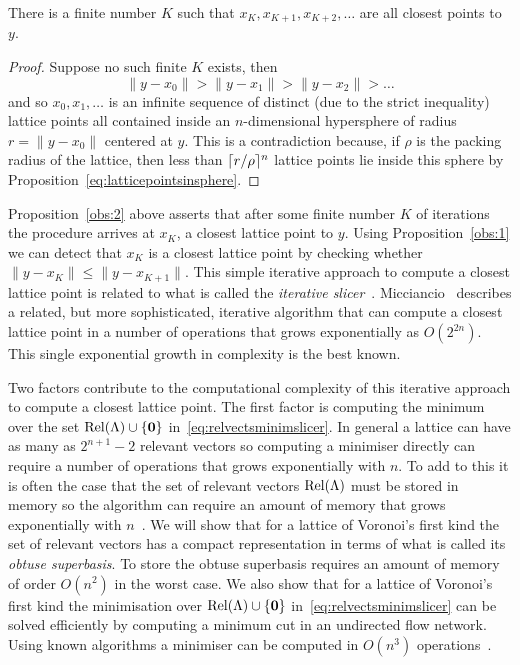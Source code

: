\documentclass[final,leqno]{siamltex}
\begin{document}
 \begin{proposition}\label{obs:2}
 There is a finite number $K$ such that $x_K, x_{K+1}, x_{K+2}, \dots$ are all closest points to $y$.
 \end{proposition}
 \begin{proof}
Suppose no such finite $K$ exists, then
\[
\|y - x_0\| >  \|y - x_1\| > \|y - x_2\| > \dots
\]
and so $x_0,x_1,\dots$ is an infinite sequence of distinct (due to the strict inequality) lattice points  all contained inside an $n$-dimensional hypersphere of radius $r = \|y - x_0\|$ centered at $y$.  This is a contradiction because, if $\rho$ is the packing radius of the lattice, then less than $\lceil r/\rho \rceil^n$ lattice points lie inside this sphere by Proposition~\ref{eq:latticepointsinsphere}. 
\end{proof}
 
Proposition~\ref{obs:2} above asserts that after some finite number $K$ of iterations the procedure arrives at $x_K$, a closest lattice point to $y$.  Using Proposition~\ref{obs:1} we can detect that $x_K$ is a closest lattice point by checking whether $\|y - x_K\| \leq \| y - x_{K+1} \|$.
This simple iterative approach to compute a closest lattice point is related to what is called the \emph{iterative slicer}~\cite{Shalvi_iterativeslicer_2009}.  Micciancio~\cite{Micciancio09adeterministic} describes a related, but more sophisticated, iterative algorithm that can compute a closest lattice point in a number of operations that grows exponentially as $O(2^{2 n})$.  This single exponential growth in complexity is the best known.  %

Two factors contribute to the computational complexity of this iterative approach to compute a closest lattice point.  The first factor is computing the minimum over the set $\operatorname{Rel}(\Lambda) \cup \{\boldsymbol{0}\}$ in~\eqref{eq:relvectsminimslicer}.  In general a lattice can have as many as $2^{n+1}-2$ relevant vectors so computing a minimiser directly can require a number of operations that grows exponentially with $n$.  To add to this it is often the case that the set of relevant vectors $\operatorname{Rel}(\Lambda)$ must be stored in memory so the algorithm can require an amount of memory that grows exponentially with $n$~\cite[Sec.~6]{Micciancio09adeterministic}\cite{Shalvi_iterativeslicer_2009}.  We will show that for a lattice of Voronoi's first kind the set of relevant vectors has a compact representation in terms of what is called its \emph{obtuse superbasis}.  To store the obtuse superbasis requires an amount of memory of order $O(n^2)$ in the worst case.  We also show that for a lattice of Voronoi's first kind the minimisation over $\operatorname{Rel}(\Lambda) \cup \{\boldsymbol{0}\}$ in~\eqref{eq:relvectsminimslicer} can be solved efficiently by computing a minimum cut in an undirected flow network.  Using known algorithms a minimiser can be computed in $O(n^3)$ operations~\cite{Goldberg:1986:NAM:12130.12144,EdmondsKarp_max_flow,Cormen2001}. 
\end{document}
